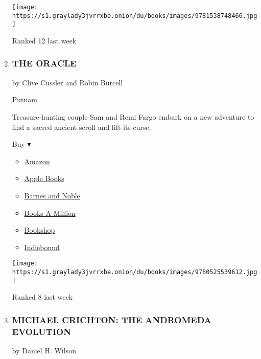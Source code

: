 \begin{enumerate}
  \texttt{[image: https://s1.graylady3jvrrxbe.onion/du/books/images/9781538748466.jpg]}

  Ranked 12 last week
\item
  \hypertarget{the-oracle}{%
  \subsubsection{THE ORACLE}\label{the-oracle}}

  by Clive Cussler and Robin Burcell

  Putnam

  Treasure-hunting couple Sam and Remi Fargo embark on a new adventure
  to find a sacred ancient scroll and lift its curse.

  Buy ▾

  \begin{itemize}
  \tightlist
  \item
    \href{https://www.amazon.com/Oracle-Sam-Remi-Fargo-Adventure/dp/0525539611?tag=NYTBS-20}{Amazon}
  \item
    \href{https://du-gae-books-dot-nyt-du-prd.appspot.com/buy?title=THE+ORACLE\&author=Clive+Cussler+and+Robin+Burcell}{Apple
    Books}
  \item
    \href{https://www.anrdoezrs.net/click-7990613-11819508?url=https\%3A\%2F\%2Fwww.barnesandnoble.com\%2Fw\%2F\%3Fean\%3D9780525539636}{Barnes
    and Noble}
  \item
    \href{https://www.anrdoezrs.net/click-7990613-35140?url=https\%3A\%2F\%2Fwww.booksamillion.com\%2Fp\%2FTHE\%2BORACLE\%2FClive\%2BCussler\%2Band\%2BRobin\%2BBurcell\%2F9780525539636}{Books-A-Million}
  \item
    \href{https://bookshop.org/a/3546/9780525539636}{Bookshop}
  \item
    \href{https://www.indiebound.org/book/9780525539636?aff=NYT}{Indiebound}
  \end{itemize}

  \texttt{[image: https://s1.graylady3jvrrxbe.onion/du/books/images/9780525539612.jpg]}

  Ranked 8 last week
\item
  \hypertarget{michael-crichton-the-andromeda-evolution}{%
  \subsubsection{MICHAEL CRICHTON: THE ANDROMEDA
  EVOLUTION}\label{michael-crichton-the-andromeda-evolution}}

  by Daniel H. Wilson


\end{enumerate}
